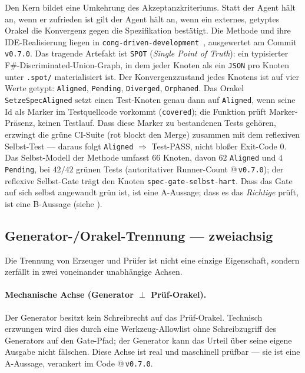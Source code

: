 \documentclass[11pt,a4paper]{article}
\theoremstyle{definition}
\theoremstyle{remark}
\begin{document}
Den Kern bildet eine Umkehrung des Akzeptanzkriteriums. Statt \glqq der Agent hält an, wenn er
zufrieden ist\grqq{} gilt \glqq der Agent hält an, wenn ein externes, getyptes Orakel die
Konvergenz gegen die Spezifikation bestätigt\grqq. Die Methode und ihre IDE-Realisierung liegen
in \texttt{cong-driven-development}~\cite{cdd2026}, ausgewertet am Commit \texttt{v0.7.0}. Das tragende Artefakt
ist \texttt{SPOT} (\emph{Single Point of Truth}): ein typisierter F\#-Discriminated-Union-Graph,
in dem jeder Knoten als ein \texttt{JSON} pro Knoten unter \texttt{.spot/} materialisiert ist.
Der Konvergenzzustand jedes Knotens ist auf vier Werte getypt: \texttt{Aligned},
\texttt{Pending}, \texttt{Diverged}, \texttt{Orphaned}. Das Orakel
\texttt{SetzeSpecAligned} setzt einen Test-Knoten genau dann auf \texttt{Aligned}, wenn seine
Id als Marker im Test\-quellcode vorkommt (\texttt{covered}); die Funktion prüft Marker-Präsenz,
keinen Testlauf. Dass diese Marker zu bestandenen Tests gehören, erzwingt die grüne CI-Suite
(rot blockt den Merge) zusammen mit dem reflexiven Selbst-Test --- daraus folgt \texttt{Aligned}
$\Rightarrow$ Test-PASS, nicht bloßer Exit-Code $0$. Das Selbst-Modell der
Methode umfasst $66$ Knoten, davon $62$ \texttt{Aligned} und $4$ \texttt{Pending}, bei
$42/42$ grünen Tests (autoritativer Runner-Count @\,\texttt{v0.7.0}); der reflexive
Selbst-Gate trägt den Knoten \texttt{spec-gate-selbst-hart}. Dass das Gate auf sich selbst
angewandt grün ist, ist eine A-Aussage; dass es das \emph{Richtige} prüft, ist eine B-Aussage
(siehe ).

\subsection{Generator-/Orakel-Trennung --- zweiachsig}
\label{sec:trennung}

Die Trennung von Erzeuger und Prüfer ist nicht eine einzige Eigenschaft, sondern zerfällt in
zwei voneinander unabhängige Achsen.

\paragraph{Mechanische Achse (Generator $\perp$ Prüf-Orakel).}
Der Generator besitzt kein Schreibrecht auf das Prüf-Orakel. Technisch erzwungen wird dies
durch eine Werkzeug-Allowlist ohne Schreibzugriff des Generators auf den Gate-Pfad; der
Generator kann das Urteil über seine eigene Ausgabe nicht fälschen. Diese Achse ist real und
maschinell prüfbar --- sie ist eine A-Aussage, verankert im Code @\,\texttt{v0.7.0}.
\end{document}
